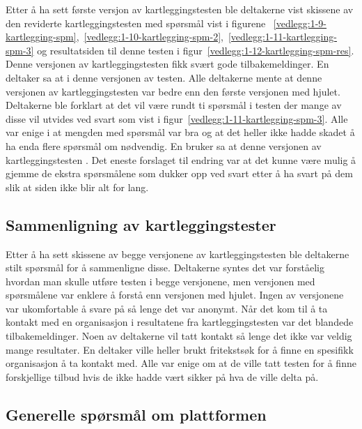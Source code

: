 Etter å ha sett første versjon av kartleggingstesten ble deltakerne vist skissene av den reviderte kartleggingstesten med spørsmål vist i figurene ~\ref{vedlegg:1-9-kartlegging-spm},~\ref{vedlegg:1-10-kartlegging-spm-2},~\ref{vedlegg:1-11-kartlegging-spm-3} og resultatsiden til denne testen i figur~\ref{vedlegg:1-12-kartlegging-spm-res}. Denne versjonen av kartleggingstesten fikk svært gode tilbakemeldinger. En deltaker sa at  i denne versjonen av testen. Alle deltakerne mente at denne versjonen av kartleggingstesten var bedre enn den første versjonen med hjulet. Deltakerne ble forklart at det vil være rundt ti spørsmål i testen der mange av disse vil utvides ved svart  som vist i figur~\ref{vedlegg:1-11-kartlegging-spm-3}. Alle var enige i at mengden med spørsmål var bra og at det heller ikke hadde skadet å ha enda flere spørsmål om nødvendig. En bruker sa at denne versjonen av kartleggingstesten . Det eneste forslaget til endring var at det kunne være mulig å gjemme de ekstra spørsmålene som dukker opp ved svart  etter å ha svart på dem slik at siden ikke blir alt for lang.


\subsection{Sammenligning av kartleggingstester}

Etter å ha sett skissene av begge versjonene av kartleggingstesten ble deltakerne stilt spørsmål for å sammenligne disse. Deltakerne syntes det var forståelig hvordan man skulle utføre testen i begge versjonene, men versjonen med spørsmålene var enklere å forstå enn versjonen med hjulet. Ingen av versjonene var ukomfortable å svare på så lenge det var anonymt. Når det kom til å ta kontakt med en organisasjon i resultatene fra kartleggingstesten var det blandede tilbakemeldinger. Noen av deltakerne vil tatt kontakt så lenge det ikke var veldig mange resultater. En deltaker ville heller brukt fritekstsøk for å finne en spesifikk organisasjon å ta kontakt med. Alle var enige om at de ville tatt testen for å finne forskjellige tilbud hvis de ikke hadde vært sikker på hva de ville delta på.

\subsection{Generelle spørsmål om plattformen}

